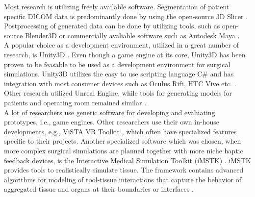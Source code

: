 Most research is utilizing freely available software.
Segmentation of patient specific DICOM data is predominantly done by using the open-source 3D Slicer \cite{Barber.2018,Barber.2020}.
Postprocessing of generated data can be done by utilizing tools, such as open-source Blender3D or commercially avaliable software such as Autodesk Maya \cite{Barber.2020,Parham.2019,Sampogna.2017}.
\\ A popular choice as a development environment, utilized in a great number of research, is Unity3D \cite{Parham.2019,Pulijala.2017,Sampogna.2017}.
Even though a game engine at its core, Unity3D has been proven to be feasable to be used as a development environment for surgical simulations.
Unity3D utilizes the easy to use scripting language C\# and has integration with most consumer devices such as Oculus Rift, HTC Vive etc. \cite{wang2010new}.
\\
Other research utilized Unreal Engine, while tools for generating models for patients and operating room remained similar \cite{Barber.2020}.
\\
A lot of researchers use generic software for developing and evaluating prototypes, i.e., game engines. Other researchers use their own in-house developments, e.g., ViSTA VR Toolkit \cite{RN70}, which often 
have specialized features specific to their projects.
Another specialized software which was chosen, when more complex surgical simulations are planned together with more niche haptic feedback devices, is 
the Interactive Medical Simulation Toolkit (iMSTK) \cite{VenkataS.Arikatla.2018}.
iMSTK provides tools to realistically simulate tissue. 
The framework contains advanced algorithms for modeling of tool-tissue interactions that capture the behavior of 
aggregated tissue and organs at their boundaries or interfaces \cite{VenkataS.Arikatla.2018}.